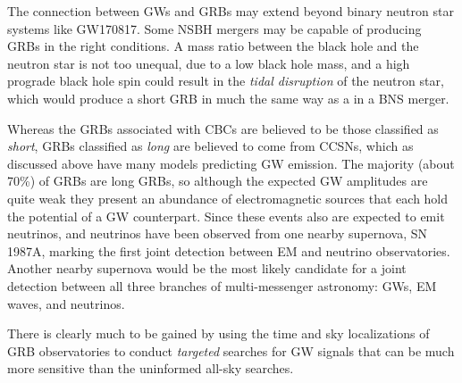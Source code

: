 The connection between GWs and GRBs may extend beyond binary neutron star systems like GW170817.
Some \ac{NSBH} mergers may be capable of producing GRBs in the right conditions.
A mass ratio between the black hole and the neutron star is not too unequal, due to a low black hole mass, and a high prograde black hole spin could result in the \textit{tidal disruption} of the neutron star, which would produce a short GRB in much the same way as a in a \ac{BNS} merger.

Whereas the GRBs associated with \acp{CBC} are believed to be those classified as \textit{short}, GRBs classified as \textit{long} are believed to come from \acp{CCSN}, which as discussed above have many models predicting GW emission.
The majority (about 70\%) of GRBs are long GRBs, so although the expected GW amplitudes are quite weak they present an abundance of electromagnetic sources that each hold the potential of a GW counterpart.
Since these events also are expected to emit neutrinos, and neutrinos have been observed from one nearby supernova, SN 1987A, marking the first joint detection between EM and neutrino observatories.
Another nearby supernova would be the most likely candidate for a joint detection between all three branches of multi-messenger astronomy: GWs, EM waves, and neutrinos.

There is clearly much to be gained by using the time and sky localizations of GRB observatories to conduct \textit{targeted} searches for GW signals that can be much more sensitive than the uninformed all-sky searches.
